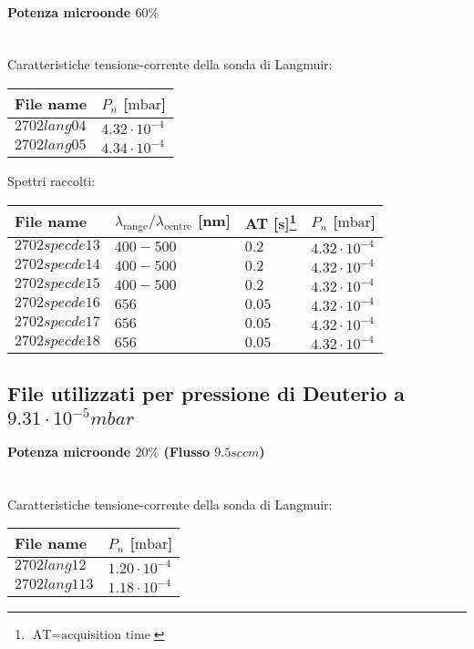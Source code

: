\paragraph*{Potenza microonde $\text{60\%}$} ~\\
Caratteristiche tensione-corrente della sonda di Langmuir:
\begin{center}
\begin{tabular}{p{3cm}p{3cm}}
\toprule
File name	&$P_n$ [$\si{\milli\bar}$]\\
\midrule
$2702lang04$	&$4.32\cdot10^{-4}$\\
$2702lang05$	&$4.34\cdot10^{-4}$\\
\bottomrule
\end{tabular}
\end{center}

Spettri raccolti:
\begin{center}
\begin{tabular}{p{3cm}p{4cm}p{2cm}p{3cm}}
\toprule
File name	&$\lambda_\text{range}\text{/}\lambda_\text{centre}$ [nm] 	&AT [s]\footnote{$\text{AT}=\text{acquisition time}$} &$P_n$ [$\si{\milli\bar}$]\\
\midrule
$2702specde13$	&$400-500$	&$0.2$		&$4.32\cdot10^{-4}$\\
$2702specde14$	&$400-500$	&$0.2$		&$4.32\cdot10^{-4}$\\
$2702specde15$	&$400-500$	&$0.2$		&$4.32\cdot10^{-4}$\\
$2702specde16$	&$656$		&$0.05$		&$4.32\cdot10^{-4}$\\
$2702specde17$	&$656$		&$0.05$		&$4.32\cdot10^{-4}$\\
$2702specde18$	&$656$		&$0.05$		&$4.32\cdot10^{-4}$\\
\bottomrule
\end{tabular}
\end{center}



\subsection{File utilizzati per pressione di Deuterio a $9.31\cdot10^{-5}mbar$}

\paragraph*{Potenza microonde $\text{20\%}$ (Flusso $9.5sccm$) }~\\
Caratteristiche tensione-corrente della sonda di Langmuir:
\begin{center}
\begin{tabular}{p{3cm}p{3cm}}
\toprule
File name	&$P_{n}$ [$\si{\milli\bar}$]\\
\midrule
$2702lang12$	&$1.20\cdot10^{-4}$\\
$2702lang113$	&$1.18\cdot10^{-4}$\\
\bottomrule
\end{tabular}
\end{center}

